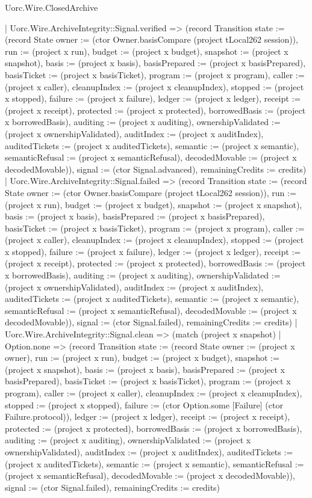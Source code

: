 \begin{lexlean}{Uorc.Wire.ClosedArchive}
\begin{semanticmodule}
{      | Uorc.Wire.ArchiveIntegrity::Signal.verified => (record Transition {state := (record State {owner := (ctor Owner.basisCompare (project tLocal262 session)), run := (project x run), budget := (project x budget), snapshot := (project x snapshot), basis := (project x basis), basisPrepared := (project x basisPrepared), basisTicket := (project x basisTicket), program := (project x program), caller := (project x caller), cleanupIndex := (project x cleanupIndex), stopped := (project x stopped), failure := (project x failure), ledger := (project x ledger), receipt := (project x receipt), protected := (project x protected), borrowedBasis := (project x borrowedBasis), auditing := (project x auditing), ownershipValidated := (project x ownershipValidated), auditIndex := (project x auditIndex), auditedTickets := (project x auditedTickets), semantic := (project x semantic), semanticRefusal := (project x semanticRefusal), decodedMovable := (project x decodedMovable)}), signal := (ctor Signal.advanced), remainingCredits := credits})
      | Uorc.Wire.ArchiveIntegrity::Signal.failed => (record Transition {state := (record State {owner := (ctor Owner.basisCompare (project tLocal262 session)), run := (project x run), budget := (project x budget), snapshot := (project x snapshot), basis := (project x basis), basisPrepared := (project x basisPrepared), basisTicket := (project x basisTicket), program := (project x program), caller := (project x caller), cleanupIndex := (project x cleanupIndex), stopped := (project x stopped), failure := (project x failure), ledger := (project x ledger), receipt := (project x receipt), protected := (project x protected), borrowedBasis := (project x borrowedBasis), auditing := (project x auditing), ownershipValidated := (project x ownershipValidated), auditIndex := (project x auditIndex), auditedTickets := (project x auditedTickets), semantic := (project x semantic), semanticRefusal := (project x semanticRefusal), decodedMovable := (project x decodedMovable)}), signal := (ctor Signal.failed), remainingCredits := credits})
      | Uorc.Wire.ArchiveIntegrity::Signal.clean => (match (project x snapshot)
        | Option.none => (record Transition {state := (record State {owner := (project x owner), run := (project x run), budget := (project x budget), snapshot := (project x snapshot), basis := (project x basis), basisPrepared := (project x basisPrepared), basisTicket := (project x basisTicket), program := (project x program), caller := (project x caller), cleanupIndex := (project x cleanupIndex), stopped := (project x stopped), failure := (ctor Option.some [Failure] (ctor Failure.protocol)), ledger := (project x ledger), receipt := (project x receipt), protected := (project x protected), borrowedBasis := (project x borrowedBasis), auditing := (project x auditing), ownershipValidated := (project x ownershipValidated), auditIndex := (project x auditIndex), auditedTickets := (project x auditedTickets), semantic := (project x semantic), semanticRefusal := (project x semanticRefusal), decodedMovable := (project x decodedMovable)}), signal := (ctor Signal.failed), remainingCredits := credits})
}
\end{semanticmodule}
\end{lexlean}
